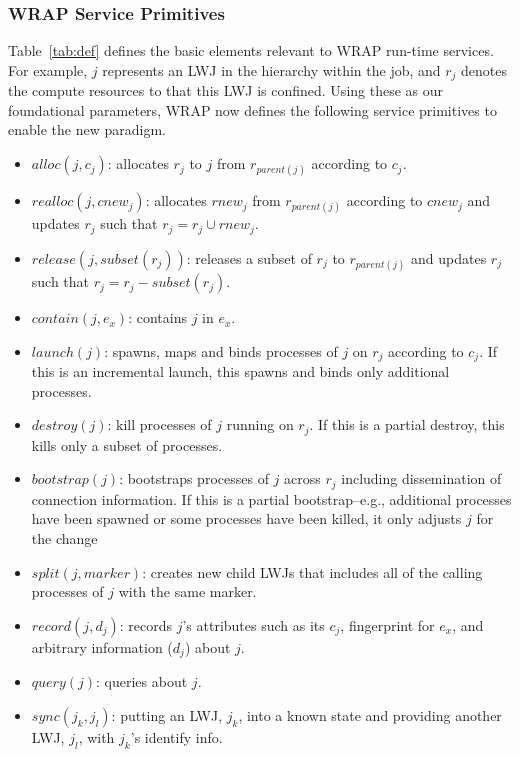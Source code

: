 \subsubsection{WRAP Service Primitives}
\label{sect:prim}

Table~\ref{tab:def} defines the basic elements relevant to WRAP run-time services.
For example, $j$ represents an LWJ in the hierarchy within the job, and 
$r_j$ denotes the compute resources to that this LWJ is confined.
Using these as our foundational parameters, WRAP now defines
the following service primitives to enable the new paradigm.

\begin{itemize}

\item{$alloc(j, c_j)$: allocates $r_j$ to $j$ from $r_{parent(j)}$ according to $c_j$.}

\item{$realloc(j, cnew_j)$: allocates $rnew_j$ from $r_{parent(j)}$ according to $cnew_j$ and updates $r_j$ such that $r_j = r_j \cup rnew_j$.}

\item{$release(j, subset(r_j))$: releases a subset of $r_j$ to $r_{parent(j)}$ and updates $r_j$ such that $r_j = r_j - subset(r_j)$.}

\item{$contain(j, e_x)$: contains $j$ in $e_x$.}

\item{$launch(j)$: spawns, maps and binds processes of $j$ on $r_j$ according to $c_j$. If this is an incremental launch, this spawns and binds only additional processes.}

\item{$destroy(j)$: kill processes of $j$ running on $r_j$. If this is a partial destroy, this kills only a subset of processes.}

\item{$bootstrap(j)$: bootstraps processes of $j$ across $r_j$ including dissemination of connection information. If this is a partial bootstrap--e.g., additional processes have been spawned or some processes have been killed, it only adjusts $j$ for the change}

\item{$split(j, marker)$: creates new child LWJs that includes all of the calling processes of $j$ with the same marker.}

\item{$record(j, d_j)$: records $j$'s attributes such as its $c_j$, fingerprint for $e_x$, and arbitrary information ($d_j$) about $j$.}

\item{$query(j)$: queries about $j$.}

\item{$sync(j_k, j_l)$: putting an LWJ, $j_k$, into a known state and providing another LWJ, $j_l$, with $j_k$'s identify info.}

\end{itemize}


